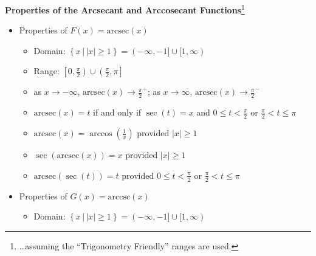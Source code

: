 \smallskip

\colorbox{ResultColor}{\bbm

\begin{thm} \label{arcsecantcosecantfunctionprops1}  \textbf{Properties of the Arcsecant and Arccosecant Functions}\footnote{\ldots assuming the ``Trigonometry Friendly'' ranges are used.} 

\begin{itemize}

\item Properties of $F(x)= \mbox{arcsec}(x)$  

\begin{itemize}

\item Domain:  $\left\{ x \, | \,  |x| \geq 1 \right\} = (-\infty, -1] \cup [1,\infty)$

\item Range:  $\left[0, \frac{\pi}{2} \right) \cup \left(\frac{\pi}{2}, \pi\right]$

\item  as $x \rightarrow -\infty$, $\mbox{arcsec}(x) \rightarrow \frac{\pi}{2}^{+}$;  as $x \rightarrow \infty$, $\mbox{arcsec}(x) \rightarrow \frac{\pi}{2}^{-}$

\item  $\mbox{arcsec}(x) = t$ if and only if $\sec(t) = x$ and $0 \leq t < \frac{\pi}{2}$ or $ \frac{\pi}{2} < t \leq \pi$

\item  $\mbox{arcsec}(x) = \arccos\left(\frac{1}{x}\right)$ provided $|x| \geq 1$

\item  $\sec\left(\mbox{arcsec}(x)\right) = x$ provided $|x| \geq 1$

\item  $\mbox{arcsec}(\sec(t)) = t$ provided $0 \leq t < \frac{\pi}{2}$ or $\frac{\pi}{2} < t \leq \pi$

\end{itemize}

\item  Properties of $G(x) = \mbox{arccsc}(x)$  

\begin{itemize}

\item  Domain:  $\left\{ x \, | \,  |x| \geq 1 \right\} = (-\infty, -1] \cup [1,\infty)$


\end{itemize}
\end{itemize}
\end{thm}}
